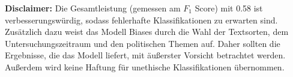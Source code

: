\textbf{Disclaimer:} Die Gesamtleistung (gemessen am \(F_1\) Score) mit \num{0.58} ist verbesserungswürdig, sodass fehlerhafte Klassifikationen zu erwarten sind. Zusätzlich dazu weist das Modell Biases durch die Wahl der Textsorten, dem Untersuchungszeitraum und den politischen Themen auf. Daher sollten die Ergebnisse, die das Modell liefert, mit äußerster Vorsicht betrachtet werden. Außerdem wird keine Haftung für unethische Klassifikationen übernommen.
